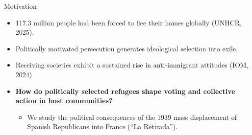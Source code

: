 \documentclass[10pt]{beamer}
\begin{document}
\begin{frame}{Motivation}

\begin{itemize}

  \item 117.3 million people had been forced to flee their homes globally (UNHCR, 2025). 
  \item Politically motivated persecution generates ideological selection into exile.
  \item Receiving societies exhibit a sustained rise in anti-immigrant attitudes (IOM, 2024)
\vspace{0.4cm}
  \item \textbf{How do politically selected refugees shape voting and collective action in host communities?}
\begin{itemize}
\item We study the political consequences of the 1939 mass displacement of Spanish Republicans into France (“La Retirada”).
\end{itemize}
\end{itemize}





\end{frame}
\end{document}
